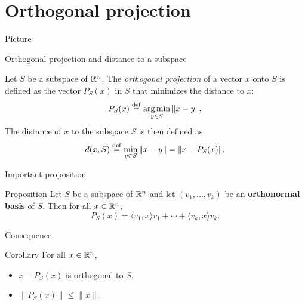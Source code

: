 \documentclass{beamer}
\begin{document}
\section{Orthogonal projection}

\begin{frame}[t]{Picture}
	\grid

\end{frame}

\begin{frame}[t]{Orthogonal projection and distance to a subspace}
	\begin{definition}
		Let $S$ be a subspace of $\mathbb{R}^n$. The \emph{orthogonal projection} of a vector $x$ onto $S$ is defined as the vector $P_S(x)$ in $S$ that minimizes the distance to $x$:
		$$
		P_S(x) \overset{\rm def}{=} \operatorname*{arg\,min}_{y \in S} \|x - y\|.
		$$
		The distance of $x$ to the subspace $S$ is then defined as
		$$
		d(x,S) \overset{\rm def}{=} \min_{y \in S} \| x - y \| = \|x - P_S(x)\|.
		$$
	\end{definition}
\end{frame}

\begin{frame}[t]{Important proposition}
	\grid 

	\vspace{-0.4cm}
	\begin{block}{Proposition}
		Let $S$ be a subspace of $\mathbb{R}^n$ and let $(v_1, \dots, v_k)$ be an \textbf{orthonormal basis} of $S$. Then for all $x \in \mathbb{R}^n$,
		$$P_S(x) = \langle v_1, x \rangle v_1 + \cdots + \langle v_k, x \rangle v_k.$$
	\end{block}
\end{frame}



\begin{frame}[t]{Consequence}
	\grid

	\vspace{-0.4cm}
	\begin{block}{Corollary}
		For all $x \in \mathbb{R}^n$,
		\begin{itemize}
			\item $x - P_S(x)$ is orthogonal to $S$.
			\item $\|P_S(x) \| \leq \|x\|$.
		\end{itemize}
	\end{block}
\end{frame}
\end{document}
